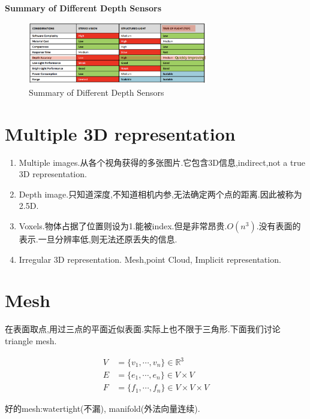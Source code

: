 \textbf{Summary of Different Depth Sensors}

\begin{figure}
    \centering
    \includegraphics[width=0.7\textwidth]{figures/sensors.png}
    \caption{Summary of Different Depth Sensors}
\end{figure}

\section{Multiple 3D representation}

\begin{enumerate}
    \item Multiple images.从各个视角获得的多张图片.它包含3D信息,indirect,not a true 3D representation.
    \item Depth image.只知道深度,不知道相机内参,无法确定两个点的距离.因此被称为2.5D.
    \item Voxels.物体占据了位置则设为1.能被index.但是非常昂贵.$O(n^3)$.没有表面的表示.一旦分辨率低,则无法还原丢失的信息.
    \item Irregular 3D representation. Mesh,point Cloud, Implicit representation.
\end{enumerate}

\section{Mesh}

在表面取点,用过三点的平面近似表面.实际上也不限于三角形.下面我们讨论triangle mesh.

\begin{equation}
    \begin{aligned}
        V &= \{v_1, \cdots, v_n\} \in \mathbb R^3
        \\
        E &= \{e_1, \cdots, e_n\} \in V\times V
        \\
        F &= \{f_1, \cdots, f_n\} \in V\times V \times V
    \end{aligned}
\end{equation}


好的mesh:watertight(不漏), manifold(外法向量连续).

